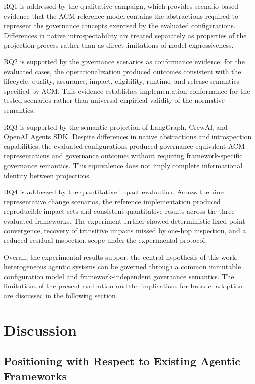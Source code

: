 \documentclass[10pt]{article}
\begin{document}
RQ1 is addressed by the qualitative campaign, which provides scenario-based evidence that the ACM reference model contains the abstractions required to represent the governance concepts exercised by the evaluated configurations. Differences in native introspectability are treated separately as properties of the projection process rather than as direct limitations of model expressiveness.

RQ2 is supported by the governance scenarios as conformance evidence: for the evaluated cases, the operationalization produced outcomes consistent with the lifecycle, quality, assurance, impact, eligibility, runtime, and release semantics specified by ACM. This evidence establishes implementation conformance for the tested scenarios rather than universal empirical validity of the normative semantics. 

RQ3 is supported by the semantic projection of LangGraph, CrewAI, and OpenAI Agents SDK. Despite differences in native abstractions and introspection capabilities, the evaluated configurations produced governance-equivalent ACM representations and governance outcomes without requiring framework-specific governance semantics. This equivalence does not imply complete informational identity between projections. 

RQ4 is addressed by the quantitative impact evaluation. Across the nine representative change scenarios, the reference implementation produced reproducible impact sets and consistent quantitative results across the three evaluated frameworks. The experiment further showed deterministic fixed-point convergence, recovery of transitive impacts missed by one-hop inspection, and a reduced residual inspection scope under the experimental protocol.

Overall, the experimental results support the central hypothesis of this work: heterogeneous agentic systems can be governed through a common immutable configuration model and framework-independent governance semantics. The limitations of the present evaluation and the implications for broader adoption are discussed in the following section.

\section{Discussion}
\label{sec:discussion}
\subsection{Positioning with Respect to Existing Agentic Frameworks}
\label{sec:positioning}
\end{document}
